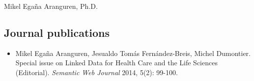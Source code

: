 \documentclass[english,11pt,a4paper,oneside]{article}
\begin{document}
\begin{cv}{Mikel Ega\~na Aranguren, Ph.D. }


\subsection*{Journal publications} %

\begin{itemize}




% 
% 
% 
% 
% 





\item Mikel Ega\~na Aranguren, Jesualdo Tom\'as Fern\'andez-Breis, Michel Dumontier. Special issue on Linked Data for Health Care and the Life Sciences (Editorial). \textit{Semantic Web Journal} 2014, 5(2): 99-100.


\end{itemize}
\end{cv}
\end{document}
